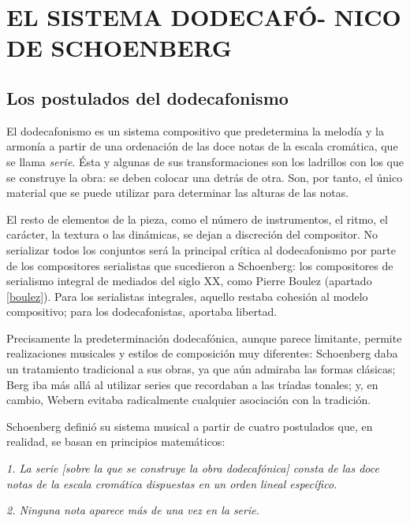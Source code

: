 \chapter[EL SISTEMA DODECAFÓNICO DE SCHOENBERG]{EL SISTEMA DODECAFÓ- NICO DE SCHOENBERG}
	\section{Los postulados del dodecafonismo}
		El dodecafonismo es un sistema compositivo que predetermina la melodía y la armonía a partir de una ordenación de las doce notas de la escala cromática, que se llama \textit{serie}. Ésta y algunas de sus transformaciones son los ladrillos con los que se construye la obra: se deben colocar una detrás de otra. Son, por tanto, el único material que se puede utilizar para determinar las alturas de las notas.
		
		El resto de elementos de la pieza, como el número de instrumentos, el ritmo, el carácter, la textura o las dinámicas, se dejan a discreción del compositor. No serializar todos los conjuntos será la principal crítica al dodecafonismo por parte de los compositores serialistas que sucedieron a Schoenberg: los compositores de serialismo integral de mediados del siglo XX, como Pierre Boulez (apartado \ref{boulez}). Para los serialistas integrales, aquello restaba cohesión al modelo compositivo; para los dodecafonistas, aportaba libertad.
		
		Precisamente la predeterminación dodecafónica, aunque parece limitante, permite realizaciones musicales y estilos de composición muy diferentes: Schoenberg daba un tratamiento tradicional a sus obras, ya que aún admiraba las formas clásicas; Berg iba más allá al utilizar series que recordaban a las tríadas tonales; y, en cambio, Webern evitaba radicalmente cualquier asociación con la tradición.
		
		Schoenberg definió su sistema musical a partir de cuatro postulados que, en realidad, se basan en principios matemáticos:
		
		\emph{1. La serie \emph{[sobre la que se construye la obra dodecafónica]} consta de las doce notas de la escala cromática dispuestas en un orden lineal específico.}
		
		\emph{2. Ninguna nota aparece más de una vez en la serie.}
		
